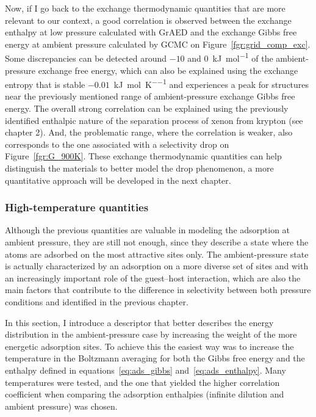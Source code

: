 \documentclass[main]{subfiles}
\begin{document}
Now, if I go back to the exchange thermodynamic quantities that are more relevant to our context, a good correlation is observed between the exchange enthalpy at low pressure calculated with GrAED and the exchange Gibbs free energy at ambient pressure calculated by GCMC on Figure~\ref{fgr:grid_comp_exc}. Some discrepancies can be detected around $-10$ and $0$~\si{\kilo\joule\per\mole} of the ambient-pressure exchange free energy, which can also be explained using the exchange entropy that is stable $-0.01$~\si{\kilo\joule\per\mole\per\kelvin} and experiences a peak for structures near the previously mentioned range of ambient-pressure exchange Gibbs free energy. The overall strong correlation can be explained using the previously identified enthalpic nature of the separation process of xenon from krypton (see chapter 2). And, the problematic range, where the correlation is weaker, also corresponds to the one associated with a selectivity drop on Figure~\ref{fgr:G_900K}. These exchange thermodynamic quantities can help distinguish the materials to better model the drop phenomenon, a more quantitative approach will be developed in the next chapter.


\subsubsection{High-temperature quantities}

Although the previous quantities are valuable in modeling the adsorption at ambient pressure, they are still not enough, since they describe a state where the atoms are adsorbed on the most attractive sites only. The ambient-pressure state is actually characterized by an adsorption on a more diverse set of sites and with an increasingly important role of the guest--host interaction, which are also the main factors that contribute to the difference in selectivity between both pressure conditions and identified in the previous chapter.

In this section, I introduce a descriptor that better describes the energy distribution in the ambient-pressure case by increasing the weight of the more energetic adsorption sites. To achieve this the easiest way was to increase the temperature in the Boltzmann averaging for both the Gibbs free energy and the enthalpy defined in equations~\ref{eq:ads_gibbs} and~\ref{eq:ads_enthalpy}. Many temperatures were tested, and the one that yielded the higher correlation coefficient when comparing the adsorption enthalpies (infinite dilution and ambient pressure) was chosen. 
\end{document}
